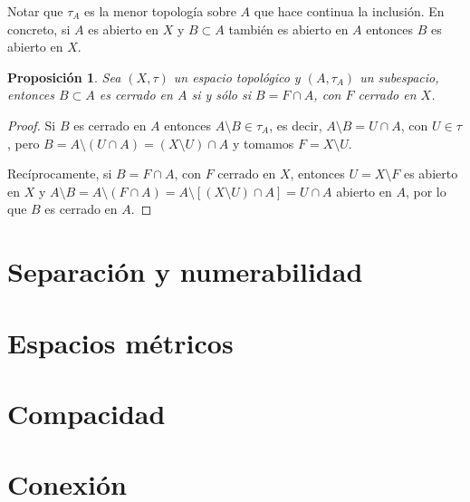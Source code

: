 \documentclass[12pt]{article}
\newtheorem{proposition}[theorem]{Proposición}
\begin{document}
Notar que $\tau_A$ es la menor topología sobre $A$ que hace continua la inclusión. En concreto, si $A$ es abierto en $X$ y $B \subset A$ también es abierto en $A$ entonces $B$ es abierto en $X$.

\begin{proposition}Sea $(X, \tau)$ un espacio topológico y $(A, \tau_A)$ un subespacio, entonces $B \subset A$ es cerrado en $A$ si y sólo si $B = F \cap A$, con $F$ cerrado en $X$.
\end{proposition}
\begin{proof}
Si $B$ es cerrado en $A$ entonces $A \setminus B \in \tau_A$, es decir, $A \setminus B = U \cap A$, con $U \in \tau$, pero $B = A \setminus (U \cap A) = (X \setminus U ) \cap A$ y tomamos $F = X \setminus U.$

Recíprocamente, si $B = F \cap A$, con $F$ cerrado en $X$, entonces $U = X \setminus F$ es abierto en $X$ y $A \setminus B = A \setminus (F \cap A) = A \setminus [(X \setminus U) \cap A] = U \cap A$ abierto en $A$, por lo que $B$ es cerrado en $A$.

\end{proof}


\section{Separación y numerabilidad}
\section{Espacios métricos}
\section{Compacidad}
\section{Conexión}
\end{document}
